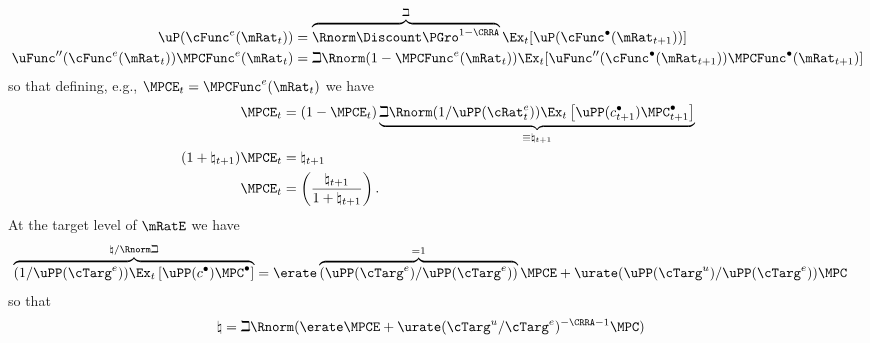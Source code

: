 \documentclass{handout}
\begin{document}
\begin{equation}\begin{gathered}\begin{aligned}
  \uP(\cFunc^{e}(\mRat_{t})) & = \overbrace{\Rnorm \Discount \PGro^{1-\CRRA}}^{\beth} \Ex_{t}[\uP(\cFunc^{\bullet}(\mRat_{t+1}))]
\\  \uFunc^{\prime\prime}(\cFunc^{e}(\mRat_{t}))\MPCFunc^{e}(\mRat_{t}) & = \beth  \Rnorm (1-\MPCFunc^{e}(\mRat_{t}))\Ex_{t}[\uFunc^{\prime\prime}(\cFunc^{\bullet}(\mRat_{t+1}))\MPCFunc^{\bullet}(\mRat_{t+1})] \label{eq:dEuler}
\end{aligned}\end{gathered}\end{equation}
so that defining, e.g., $\MPCE_{t} = \MPCFunc^{e}(\mRat_{t})$ we have 
\begin{equation}\begin{gathered}\begin{aligned}
 \MPCE_{t} & =  (1-\MPCE_{t}) \underbrace{\beth \Rnorm (1/\uPP({\cRat}^{e}_{t}))\Ex_{t}\left[\uPP(c^{\bullet}_{t+1})\MPC^{\bullet}_{t+1}\right]}_{\equiv \natural_{t+1}} \label{eq:natural}
\\ (1+\natural_{t+1})\MPCE_{t} & = \natural_{t+1} \label{eq:naturalMPC}
\\ \MPCE_{t} & = \left(\frac{\natural_{t+1}}{1+\natural_{t+1}}\right) \label{eq:naturalSolved}
.
\end{aligned}\end{gathered}\end{equation}
\newcommand{\Mma}{{\it Mathematica}~}
At the target level of $\mRatE$ we have 
\begin{equation*}\begin{gathered}\begin{aligned}
  \overbrace{(1/\uPP(\cTarg^{e}))\Ex_{t}\left[\uPP(c^{\bullet})\MPC^{\bullet}\right]}^{\natural / \Rnorm \beth} & =  \erate \overbrace{(\uPP(\cTarg^{e})/\uPP(\cTarg^{e}))}^{=1}\MPCE+\urate (\uPP(\cTarg^{u})/\uPP(\cTarg^{e}))\MPCU
\end{aligned}\end{gathered}\end{equation*}
so that 
\begin{equation}\begin{gathered}\begin{aligned}
  \natural & =   \beth \Rnorm (\erate \MPCE + \urate (\cTarg^{u}/\cTarg^{e})^{-\CRRA-1} \MPCU)
\end{aligned}\end{gathered}\end{equation}
\end{document}
